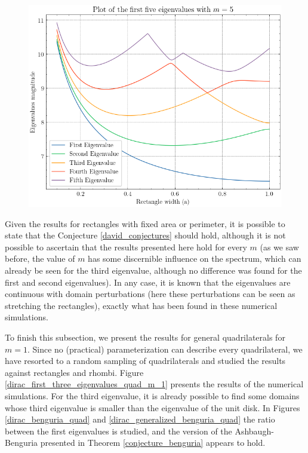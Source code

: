 \begin{figure}[!htb]
\begin{minipage}{.5\textwidth}
      \includegraphics[width=1\linewidth]{Images/Dirac/quad/eigenvalues_rectangle_perimeter_width_m_5.png}
      \captionsetup{width=0.9\linewidth} %
      \label{eigenvalues_rectangle_perimeter_width_m_5}
    \end{minipage}
\end{figure}

Given the results for rectangles with fixed area or perimeter, it is possible to state that the Conjecture \ref{david_conjectures} should hold, although it is not possible to ascertain that the results presented here hold for every \(m\) (as we saw before, the value of \(m\) has some discernible influence on the spectrum, which can already be seen for the third eigenvalue, although no difference was found for the first and second eigenvalues). In any case, it is known that the eigenvalues are continuous with domain perturbations (here these perturbations can be seen as stretching the rectangles), exactly what has been found in these numerical simulations.

To finish this subsection, we present the results for general quadrilaterals for \(m=1\). Since no (practical) parameterization can describe every quadrilateral, we have resorted to a random sampling of quadrilaterals and studied the results against rectangles and rhombi. Figure \ref{dirac_first_three_eigenvalues_quad_m_1} presents the results of the numerical simulations. For the third eigenvalue, it is already possible to find some domains whose third eigenvalue is smaller than the eigenvalue of the unit disk. In Figures \ref{dirac_benguria_quad} and \ref{dirac_generalized_benguria_quad} the ratio between the first eigenvalues is studied, and the version of the Ashbaugh-Benguria presented in Theorem \ref{conjecture_benguria} appears to hold.

